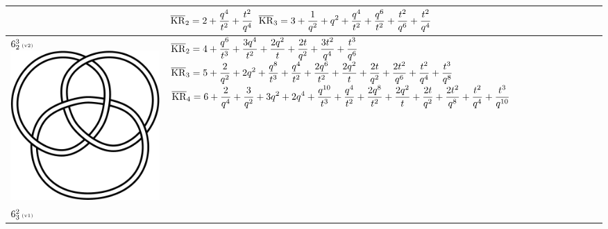 \documentclass{compositio}
\theoremstyle{definition}
\numberwithin{equation}{section}
\begin{document}
{\begin{longtable}{p{}|p{}}
& 
$
\displaystyle{%
\overline{\KR}_{2} = 2+\frac{q^4}{t^2}+\frac{t^2}{q^4}
}
$
\newline 
$
\displaystyle{%
\overline{\KR}_{3} = 3+\frac{1}{q^2}+q^2+\frac{q^4}{t^2}+\frac{q^6}{t^2}+\frac{t^2}{q^6}+\frac{t^2}{q^4}
}
$
\\
\hline
$6_{2}^3\,\text{{\tiny (v2)}}$ 
\includegraphics[scale=0.07,angle=0]{link6_2_3.pdf} 
& 
$
\displaystyle{%
\overline{\KR}_{2} = 4+\frac{q^6}{t^3}+\frac{3 q^4}{t^2}+\frac{2 q^2}{t}+\frac{2 t}{q^2}+\frac{3 t^2}{q^4}+\frac{t^3}{q^6}
}
$
\newline 
$
\displaystyle{%
\overline{\KR}_{3} = 5+\frac{2}{q^2}+2 q^2+\frac{q^8}{t^3}+\frac{q^4}{t^2}+\frac{2 q^6}{t^2}+\frac{2 q^2}{t}+\frac{2 t}{q^2}+\frac{2 t^2}{q^6}+\frac{t^2}{q^4}+\frac{t^3}{q^8}
}
$
\newline
$
\displaystyle{%
\overline{\KR}_{4} = 6+\frac{2}{q^4}+\frac{3}{q^2}+3 q^2+2 q^4+\frac{q^{10}}{t^3}+\frac{q^4}{t^2}+\frac{2 q^8}{t^2}+\frac{2 q^2}{t}+\frac{2 t}{q^2}+\frac{2 t^2}{q^8}+\frac{t^2}{q^4}+\frac{t^3}{q^{10}}
}
$
\\
\hline
$6_{3}^2\,\text{{\tiny (v1)}}$ 

\end{longtable}}
\end{document}
